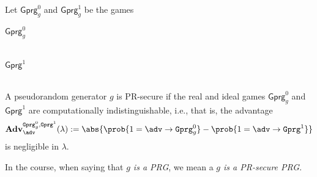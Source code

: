 \begin{security}[PRG]
  Let $\textsf{Gprg}_g^0$ and $\textsf{Gprg}_g^1$ be the games
  \begin{codebox}
    \begin{center}
      \begin{pchstack}
        \pchspace
        \begin{pcvstack}
          \underline{\underline{$\textsf{Gprg}_g^0$}}\\
          \\
          \pcvspace
          \pcvspace
        \end{pcvstack}
        \pchspace
        \begin{pcvstack}
          \underline{\underline{$\textsf{Gprg}^1$}}\\
          \\
          \pcvspace
          \pcvspace
        \end{pcvstack}
      \end{pchstack}
    \end{center}
  \end{codebox}
  A pseudorandom generator $g$ is PR-secure if the real and ideal games $\textsf{Gprg}_g^0$ and $\textsf{Gprg}^1$ are computationally indistinguishable, i.e., that is, the advantage
  \[\mathbf{Adv}_{\adv}^{
    \M{Gprg}_g^0,
    \M{Gprg}^1}
    (\lambda):=\abs{\prob{1=\adv\circ \M{Gprg}_g^0}-\prob{1=\adv\circ \M{Gprg}^1}}\]
  is negligible in $\lambda$.
\end{security}
\begin{remark}
  In the course, when saying that \emph{$g$ is a PRG}, we mean a \emph{$g$ is a PR-secure PRG}.
\end{remark}